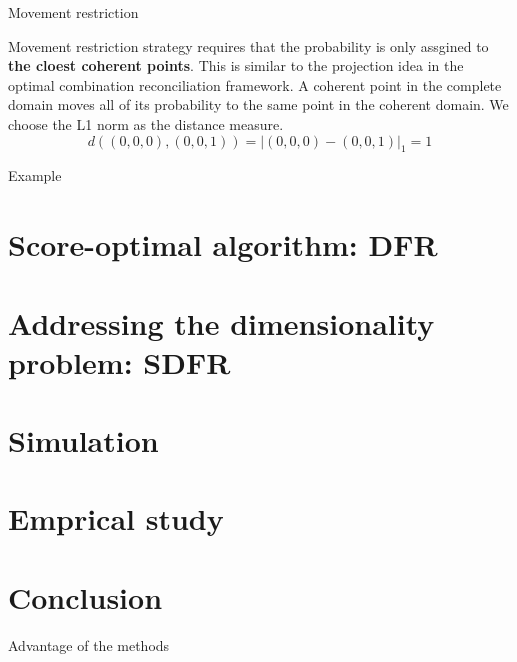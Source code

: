 \documentclass[12pt]{beamer}
\begin{document}
\begin{frame}{Movement restriction}

\begin{outline}
\0 Movement restriction strategy requires that the probability is only assgined to \textbf{the cloest coherent points}.
\1 This is similar to the projection idea in the optimal combination reconciliation framework.    
\1 A coherent point in the complete domain moves all of its probability to the same point in the coherent domain.
\1 We choose the L1 norm as the distance measure.
\[
    d((0, 0, 0), (0, 0, 1)) = |(0,0,0) - (0,0,1)|_1 = 1  
\]
\end{outline}
\vspace{-3mm}
\begin{block}{Example}\end{block}

\end{frame}


\section{Score-optimal algorithm: DFR}

\section{Addressing the dimensionality problem: SDFR}

\section{Simulation}

\section{Emprical study}

\section{Conclusion}

\begin{frame}{Advantage of the methods}
    
\end{frame}





\end{document}

